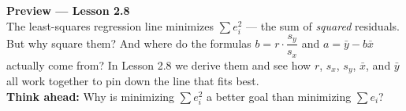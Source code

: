 \documentclass[10pt]{article}
\begin{document}
\begin{tcolorbox}[colback=greenbg, colframe=greenacc, boxrule=0.8pt, arc=2mm,
    left=4mm, right=4mm, top=3mm, bottom=3mm]
\small\textbf{Preview --- Lesson 2.8}\\[4pt]
The least-squares regression line minimizes $\sum e_i^2$ --- the sum of \textit{squared}
residuals. But why square them? And where do the formulas
$b = r \cdot \dfrac{s_y}{s_x}$ and $a = \bar{y} - b\bar{x}$
actually come from? In Lesson 2.8 we derive them and see how $r$, $s_x$, $s_y$, $\bar{x}$,
and $\bar{y}$ all work together to pin down the line that fits best.\\[6pt]
\textbf{Think ahead:} Why is minimizing $\sum e_i^2$ a better goal than minimizing $\sum e_i$?\\[6pt]
\end{tcolorbox}
\end{document}
